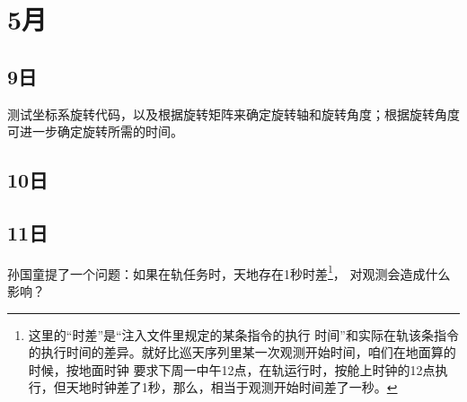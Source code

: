
\section{5月}

\subsection{9日}
测试坐标系旋转代码，以及根据旋转矩阵来确定旋转轴和旋转角度；根据旋转角度可进一步确定旋转所需的时间。


\subsection{10日}



\subsection{11日}
孙国童提了一个问题：如果在轨任务时，天地存在1秒时差\footnote{这里的“时差”是“注入文件里规定的某条指令的执行
时间”和实际在轨该条指令的执行时间的差异。就好比巡天序列里某一次观测开始时间，咱们在地面算的时候，按地面时钟
要求下周一中午12点，在轨运行时，按舱上时钟的12点执行，但天地时钟差了1秒，那么，相当于观测开始时间差了一秒。}，
对观测会造成什么影响？


